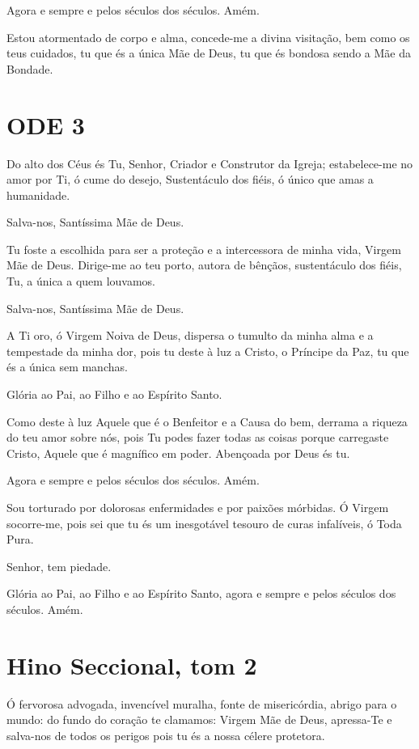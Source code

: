 \documentclass{subfiles}
\begin{document}
Agora e sempre e pelos séculos dos séculos. Amém.

Estou atormentado de corpo e alma, concede-me a divina visitação,
bem como os teus cuidados, tu que és a única Mãe de Deus, tu que és bondosa
sendo a Mãe da Bondade.

\section{ODE 3}

\eirmos{}Do alto dos Céus és Tu, Senhor, Criador e Construtor da Igreja;
estabelece-me no amor por Ti, ó cume do desejo, Sustentáculo dos fiéis, ó
único que amas a humanidade.

Salva-nos, Santíssima Mãe de Deus.

Tu foste a escolhida para ser a proteção e a intercessora de minha vida,
Virgem Mãe de Deus. Dirige-me ao teu porto, autora de bênçãos, sustentáculo
dos fiéis, Tu, a única a quem louvamos.

Salva-nos, Santíssima Mãe de Deus.

A Ti oro, ó Virgem Noiva de Deus, dispersa o tumulto da minha alma e
a tempestade da minha dor, pois tu deste à luz a Cristo, o Príncipe da Paz, tu
que és a única sem manchas.

Glória ao Pai, ao Filho e ao Espírito Santo.

Como deste à luz Aquele que é o Benfeitor e a Causa do bem, derrama
a riqueza do teu amor sobre nós, pois Tu podes fazer todas as coisas porque
carregaste Cristo, Aquele que é magnífico em poder. Abençoada por Deus és
tu.

Agora e sempre e pelos séculos dos séculos. Amém.

Sou torturado por dolorosas enfermidades e por paixões mórbidas. Ó
Virgem socorre-me, pois sei que tu és um inesgotável tesouro de curas
infalíveis, ó Toda Pura.

Senhor, tem piedade. 

Glória ao Pai, ao Filho e ao Espírito Santo, agora e sempre e pelos
séculos dos séculos. Amém.

\section{Hino Seccional, tom 2}

Ó fervorosa advogada, invencível muralha, fonte de misericórdia, abrigo para o
mundo: do fundo do coração te clamamos: Virgem Mãe de Deus, apressa-Te e
salva-nos de todos os perigos pois tu és a nossa célere protetora.
\end{document}
